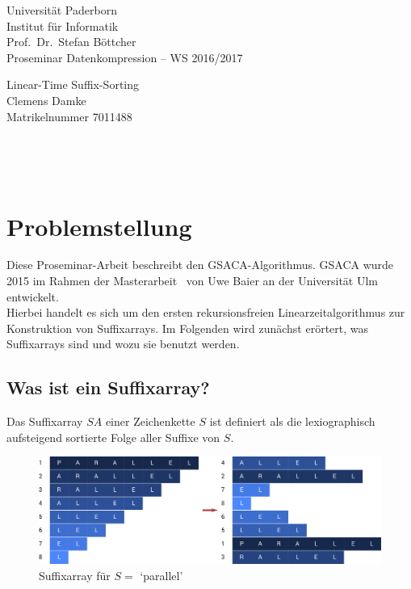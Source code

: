 \documentclass[twoside,a4paper,11pt]{article}
\theoremstyle{break}
\begin{document}
\pagestyle{empty}

\begin{center}
	\sffamily
    Universität Paderborn \\
    Institut für Informatik \\
    Prof.\ Dr.\ Stefan Böttcher\\[2ex]
    \Large Proseminar Datenkompression – WS 2016/2017

	\vspace*{\fill}
	\Huge \textcolor{blau}{Linear-Time Suffix-Sorting} \\[1ex]
    \LARGE Clemens Damke \\[1ex]
    \Large Matrikelnummer 7011488
	\vspace*{\fill}
\end{center}

\newpage
\
\newpage
\pagestyle{fancy}
\ \\[-7ex]
\tableofcontents

\newpage
\pagestyle{empty}
\
\newpage
\pagestyle{fancy}

\section{Problemstellung}

Diese Proseminar-Arbeit beschreibt den GSACA-Algorithmus. GSACA wurde 2015 im Rahmen der Masterarbeit~\cite{baierThesis} von Uwe Baier an der Universität Ulm entwickelt. \\

Hierbei handelt es sich um den ersten rekursionsfreien Linearzeitalgorithmus zur Konstruktion von Suffixarrays. Im Folgenden wird zunächst erörtert, was Suffixarrays sind und wozu sie benutzt werden.

\subsection{Was ist ein Suffixarray?}

Das Suffixarray $SA$ einer Zeichenkette $S$ ist definiert als die lexiographisch aufsteigend sortierte Folge aller Suffixe von $S$.

\begin{figure}[h]
	\centering
	\includegraphics[width=\linewidth,bb=0 0 1474 462]{./assets/whatIsASuffixArray.pdf}
	\caption{Suffixarray für $S =$ `parallel'}
\label{fig:whatIsASuffixArray}
\end{figure}
\end{document}

